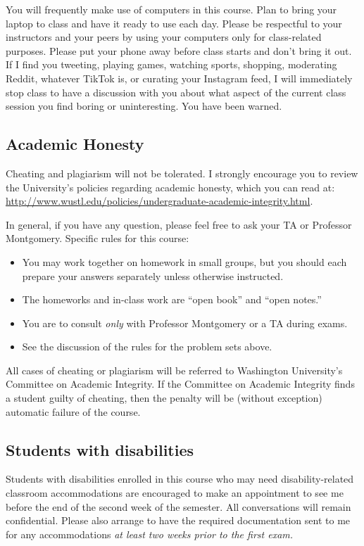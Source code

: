 \documentclass[11pt]{article}
\begin{document}
You will frequently make use of computers in this course. Plan to
bring your laptop to class and have it ready to use each day.  Please
be respectful to your instructors and your peers by using your
computers only for class-related purposes.  Please put your phone away
before class starts and don't bring it out.  If I find you tweeting,
playing games, watching sports, shopping, moderating Reddit, whatever
TikTok is, or curating your Instagram feed, I will immediately stop
class to have a discussion with you about what aspect of the current
class session you find boring or uninteresting.  You have been warned. 

\subsection*{Academic Honesty} 

Cheating and plagiarism will not be tolerated.  I strongly encourage
you to review the University's policies regarding academic honesty,
which you can read at:
\url{http://www.wustl.edu/policies/undergraduate-academic-integrity.html}.

In general, if you have any question, please feel free to ask
your TA or Professor Montgomery. Specific rules for this course:
\begin{itemize}
\item You may work together on homework in small groups, but you
  should each prepare your answers separately unless otherwise instructed.
\item The homeworks and in-class work are ``open book'' and ``open
  notes.''  
\item You are to consult \textit{only} with Professor Montgomery or
  a TA during exams.
\item See the discussion of the rules for the problem sets above.
\end{itemize}

\noindent All cases of cheating or plagiarism will be referred to Washington
University's Committee on Academic Integrity. If the Committee on
Academic Integrity finds a student guilty of cheating, then the
penalty will be (without exception) automatic failure of the course.

\subsection*{Students with disabilities}

Students with disabilities enrolled in this course who may need
disability-related classroom accommodations are encouraged to make an
appointment to see me before the end of the second week of the
semester.  All conversations will remain confidential. Please also
arrange to have the required documentation sent to me for any
accommodations \emph{at least two weeks prior to the first exam.}
\end{document}
